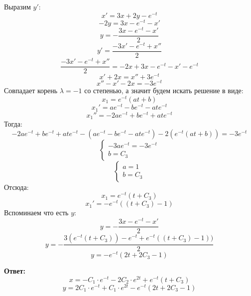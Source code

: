 \documentclass[a4paper,12pt]{article}
\begin{document}
Выразим $y'$:
\[
x' = 3x + 2y - e^{-t}
\]
\[
-2y = 3x - e^{-t} - x'
\]
\[
y = -\frac{3x -e^{-t}  -x'}{2}
\]
\[
y' = \frac{-3x' - e^{-t} + x''}{2}
\]
\[
\frac{-3x' - e^{-t} + x''}{2} = -2x + 3x - e^{-t} - x' - e^{-t}
\]
\[
x' + 2x = x'' + 3e^{-t}
\]
\[
x'' - x' - 2x = -3e^{-t}
\]
Совпадает корень $\lambda = -1$ со степенью, а значит будем искать решение в виде:
\[
x_1 = e^{-t}(at + b)
\]
\[
x_1' = a e^{-t} - b e^{-t} - at e^{-t} 
\]
\[
x_1'' = -2 a e^{-t}+ b e^{-t} + at e^{-t}
\]
Тогда:
\[
 -2 a e^{-t}+ b e^{-t} + at e^{-t} - (a e^{-t} - b e^{-t} - at e^{-t} ) - 2( e^{-t}(at + b)) = -3e^{-t}
\]
\[
\begin{cases}
-3ae^{-t} = -3e^{-t} \\
b = C_3
\end{cases}
\]
\[
\begin{cases}
a = 1 \\
b = C_3
\end{cases}
\]
Отсюда:
\[
x_1 = e^{-t}(t + C_3)
\]
\[
x_1' = -e^{-t} ((t + C_3) - 1)
\]
Вспоминаем что есть $y$:
\[
y = -\frac{3x -e^{-t}  -x'}{2}
\]
\[
y = -\frac{3(e^{-t}(t + C_3))-e^{-t}  + e^{-t} ((t + C_3) - 1))}{2}
\]
\[
y = -e^{-t}(2t + 2C_3 - 1)
\]
\begin{center}
\textbf{Ответ: } 
\[
x  =-C_1 \cdot e^{-t} - 2C_2 \cdot e^{2t}  + e^{-t}(t + C_3)
\]
\[
y =
2C_1 \cdot e^{-t} + C_1 \cdot e^{2t}  -e^{-t}(2t + 2C_3 - 1)
\]
\end{center}
\end{document}
